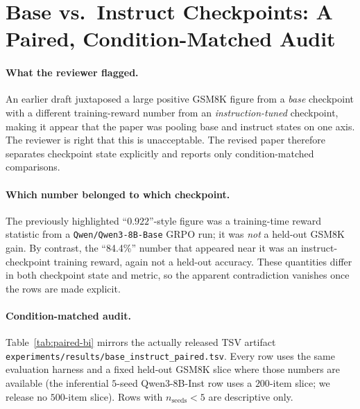 
\section{Base vs.\ Instruct Checkpoints: A Paired, Condition-Matched Audit}
\label{sec:base-instruct-paired}

\paragraph{What the reviewer flagged.}
An earlier draft juxtaposed a large positive GSM8K figure from a
\emph{base} checkpoint with a different training-reward number from an
\emph{instruction-tuned} checkpoint, making it appear that the paper was
pooling base and instruct states on one axis. The reviewer is right that
this is unacceptable. The revised paper therefore separates checkpoint
state explicitly and reports only condition-matched comparisons.

\paragraph{Which number belonged to which checkpoint.}
The previously highlighted ``$0.922$''-style figure was a
training-time reward statistic from a \texttt{Qwen/Qwen3-8B-Base} GRPO run;
it was \emph{not} a held-out GSM8K gain. By contrast, the ``84.4\%''
number that appeared near it was an instruct-checkpoint training reward,
again not a held-out accuracy. These quantities differ in both checkpoint
state and metric, so the apparent contradiction vanishes once the rows are
made explicit.

\paragraph{Condition-matched audit.}
Table~\ref{tab:paired-bi} mirrors the actually released TSV artifact
\texttt{experiments/results/base\_instruct\_paired.tsv}. Every row uses the
same evaluation harness and a fixed held-out GSM8K slice where those
numbers are available (the inferential $5$-seed Qwen3-8B-Inst row uses a
$200$-item slice; we release no $500$-item slice). Rows with
$n_{\text{seeds}}<5$ are descriptive only.

